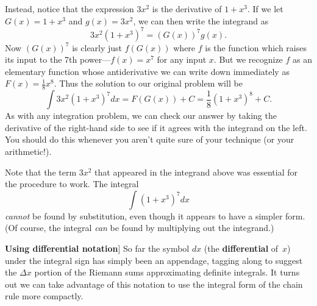 Instead, notice that the expression $3x^2$ is the derivative of
$1+x^3$.  If we let $G(x)=1+x^3$ and $g(x)=3x^2$, we can then write
the integrand as
	\[
3x^2 \left(1 + x^3\right)^7=(G(x))^7g(x).
\]
Now $(G(x))^7$ is clearly just $f(G(x))$ where $f$ is the function
which raises its input to the 7th power---$f(x)=x^7$ for any input
$x$.  But we recognize $f$ as an elementary function whose
antiderivative we can write down immediately as
$F(x)=\tfrac{1}{8}x^8$.  Thus the solution to our original problem
will be
\[
\int 3x^2 \left(1 + x^3\right)^7 dx = F(G(x))+C 
         = \dfrac{1}{8}\left(1 + x^3\right)^8+C.
\]
As with any integration problem, we can check our answer by taking the
derivative of the right-hand side to see if it agrees with the
integrand on the left.  You should do this whenever you aren't quite
sure of your technique (or your arithmetic!).

Note that the term $3x^2$ that appeared in the integrand above was essential for the procedure to work.  The integral
	\[
\int \left(1 + x^3 \right)^7 dx
\]
{\em cannot\/} be found by substitution, even though it appears to
have a simpler form.  (Of course, the integral {\em can\/} be found by
multiplying out the integrand.)






{\bf Using differential notation}\label{differentials}\quad 
[[NOTE:A compact notation for expressing the integral form of the chain rule]] 
So far the symbol $dx$ (the {\bf differential} of~$x$) under the
integral sign has simply been an appendage, tagging along to suggest
the $\Delta x$ portion of the Riemann sums approximating definite
integrals.  It turns out we can take advantage of this notation to use
the integral form of the chain rule more compactly.

